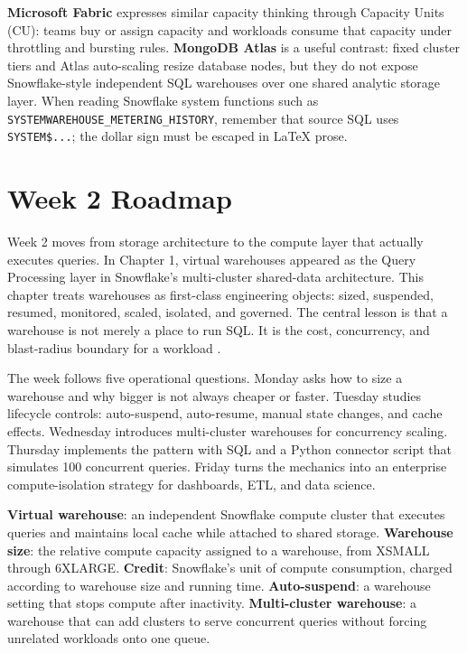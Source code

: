 \begin{crosscloud}
\vspace{1mm}
\textbf{Microsoft Fabric} expresses similar capacity thinking through Capacity Units (CU): teams buy or assign capacity and workloads consume that capacity under throttling and bursting rules. \textbf{MongoDB Atlas} is a useful contrast: fixed cluster tiers and Atlas auto-scaling resize database nodes, but they do not expose Snowflake-style independent SQL warehouses over one shared analytic storage layer. When reading Snowflake system functions such as \texttt{SYSTEM\textdollar WAREHOUSE\_METERING\_HISTORY}, remember that source SQL uses \texttt{SYSTEM\$...}; the dollar sign must be escaped in LaTeX prose.
\end{crosscloud}

\section{Week 2 Roadmap}
Week 2 moves from storage architecture to the compute layer that actually executes queries. In Chapter 1, virtual warehouses appeared as the Query Processing layer in Snowflake's multi-cluster shared-data architecture. This chapter treats warehouses as first-class engineering objects: sized, suspended, resumed, monitored, scaled, isolated, and governed. The central lesson is that a warehouse is not merely a place to run SQL. It is the cost, concurrency, and blast-radius boundary for a workload \cite{snowflakeVirtualWarehouseDocs,snowflakeWarehouseConsiderationsDocs}.

The week follows five operational questions. Monday asks how to size a warehouse and why bigger is not always cheaper or faster. Tuesday studies lifecycle controls: auto-suspend, auto-resume, manual state changes, and cache effects. Wednesday introduces multi-cluster warehouses for concurrency scaling. Thursday implements the pattern with SQL and a Python connector script that simulates 100 concurrent queries. Friday turns the mechanics into an enterprise compute-isolation strategy for dashboards, ETL, and data science.

\begin{keyterms}
\textbf{Virtual warehouse}: an independent Snowflake compute cluster that executes queries and maintains local cache while attached to shared storage.\quad
\textbf{Warehouse size}: the relative compute capacity assigned to a warehouse, from XSMALL through 6XLARGE.\quad
\textbf{Credit}: Snowflake's unit of compute consumption, charged according to warehouse size and running time.\quad
\textbf{Auto-suspend}: a warehouse setting that stops compute after inactivity.\quad
\textbf{Multi-cluster warehouse}: a warehouse that can add clusters to serve concurrent queries without forcing unrelated workloads onto one queue.
\end{keyterms}

